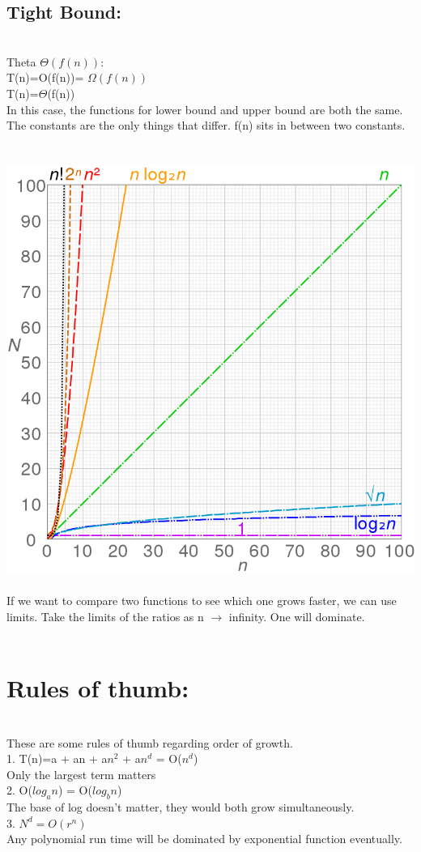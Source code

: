 \subsection{ Tight Bound:}
\\ Theta $\Theta(f(n))$: 
\\	T(n)=O(f(n))= $\Omega(f(n))$
\\	T(n)=$\Theta$(f(n))
\\	In this case, the functions for lower bound and upper bound are both the same. The constants are the only things that differ. f(n) sits in between two constants.
\\ 
\\
\\
\includegraphics[scale=0.4]{figures/complexity.png}
\\	
\\If we want to compare two functions to see which one grows faster, we can use limits. Take the limits of the ratios as n $\to$ infinity. One will dominate.
\\
\\
\section{Rules of thumb:}
\\ These are some rules of thumb regarding order of growth.
\\	1. T(n)=a + an + a$n^2$ + a$n^d$ = O($n^d$)
\\ Only the largest term matters
\\	2. O($log_an$) = O($log_bn$)
\\ The base of log doesn't matter, they would both grow simultaneously.
\\	3. $N^d=O(r^n)$
\\ Any polynomial run time will be dominated by exponential function eventually.
\\
